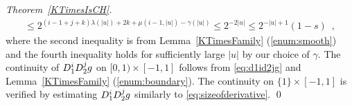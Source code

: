 \begin{proof}[Theorem~\ref{KTimesIsCH}]
\begin{align}
  \le 2^{(i-1+j+k)\lambda(|u|) + 2k + \mu(i-1, |u|)  - \gamma(|u|)}
  \le 2^{-2 \lvert u \rvert}
  \le 2^{-\lvert u \rvert + 1} (1 - s) \enspace , 
  \label{eq:sizeofderivative}
 \end{align}
where the second inequality is from 
Lemma~\ref{KTimesFamily} (\ref{enum:smooth})
and the fourth inequality holds for sufficiently large $\lvert u \rvert$
by our choice of $\gamma$. 
The continuity of $D _1 ^i D _2 ^j g$ on $[0,1) \times [-1, 1]$ follows
from \eqref{eq:d1id2jg} and Lemma~\ref{KTimesFamily} (\ref{enum:boundary}).
The continuity on $\{1\} \times [-1, 1]$ is verified by 
estimating $D_1^{i} D_2^{j} g$ similarly to \eqref{eq:sizeofderivative}. 
\qed
\end{proof} 

